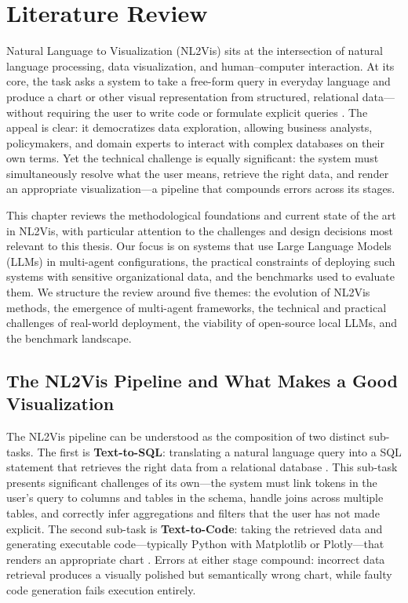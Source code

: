 \documentclass[a4paper,oneside,bibliography=totoc]{scrbook}
\begin{document}
\chapter{Literature Review}
\label{ch:related_work}

Natural Language to Visualization (NL2Vis) sits at the intersection of natural language processing, data visualization, and human--computer interaction. At its core, the task asks a system to take a free-form query in everyday language and produce a chart or other visual representation from structured, relational data---without requiring the user to write code or formulate explicit queries \cite{wu2024automated}. The appeal is clear: it democratizes data exploration, allowing business analysts, policymakers, and domain experts to interact with complex databases on their own terms. Yet the technical challenge is equally significant: the system must simultaneously resolve what the user means, retrieve the right data, and render an appropriate visualization---a pipeline that compounds errors across its stages.

This chapter reviews the methodological foundations and current state of the art in NL2Vis, with particular attention to the challenges and design decisions most relevant to this thesis. Our focus is on systems that use Large Language Models (LLMs) in multi-agent configurations, the practical constraints of deploying such systems with sensitive organizational data, and the benchmarks used to evaluate them. We structure the review around five themes: the evolution of NL2Vis methods, the emergence of multi-agent frameworks, the technical and practical challenges of real-world deployment, the viability of open-source local LLMs, and the benchmark landscape.

\section{The NL2Vis Pipeline and What Makes a Good Visualization}
\label{sec:nlvis_pipeline}

The NL2Vis pipeline can be understood as the composition of two distinct sub-tasks. The first is \textbf{Text-to-SQL}: translating a natural language query into a SQL statement that retrieves the right data from a relational database \cite{zhu2024survey}. This sub-task presents significant challenges of its own---the system must link tokens in the user's query to columns and tables in the schema, handle joins across multiple tables, and correctly infer aggregations and filters that the user has not made explicit. The second sub-task is \textbf{Text-to-Code}: taking the retrieved data and generating executable code---typically Python with Matplotlib or Plotly---that renders an appropriate chart \cite{huynh2025survey}. Errors at either stage compound: incorrect data retrieval produces a visually polished but semantically wrong chart, while faulty code generation fails execution entirely.
\end{document}
